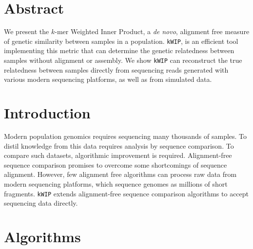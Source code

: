 \documentclass[a0,portrait]{a0poster}
\begin{document}
\begin{multicols}{2}


\section*{Abstract}

We present the $k$-mer Weighted Inner Product, a \textit{de novo}, alignment
free measure of genetic similarity between samples in a population.
\texttt{kWIP}, is an efficient tool implementing this metric that can determine
the genetic relatedness between samples without alignment or assembly. We show
\texttt{kWIP} can reconstruct the true relatedness between samples directly from
sequencing reads generated with various modern sequencing platforms, as well as
from simulated data.


\section*{Introduction}

Modern population genomics requires sequencing many thousands of samples. To
distil knowledge from this data requires analysis by sequence comparison. To
compare such datasets, algorithmic improvement is required. Alignment-free
sequence comparison promises to overcome some shortcomings of sequence
alignment. However, few alignment free algorithms can process raw data from
modern sequencing platforms, which sequence genomes as millions of short
fragments. \texttt{kWIP} extends alignment-free sequence comparison algorithms
to accept sequencing data directly.


\section*{Algorithms}


\end{multicols}
\end{document}
